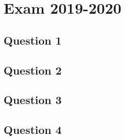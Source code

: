 \section{Exam 2019-2020}

\subsection{Question 1}
\subsection{Question 2}
\subsection{Question 3}
\subsection{Question 4}